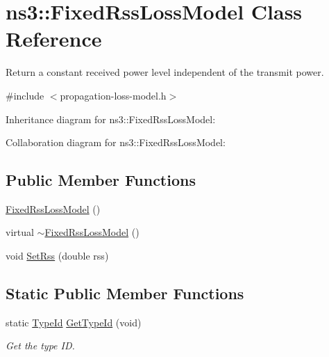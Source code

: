 \hypertarget{classns3_1_1FixedRssLossModel}{}\section{ns3\+:\+:Fixed\+Rss\+Loss\+Model Class Reference}
\label{classns3_1_1FixedRssLossModel}


Return a constant received power level independent of the transmit power.  




{\ttfamily \#include $<$propagation-\/loss-\/model.\+h$>$}



Inheritance diagram for ns3\+:\+:Fixed\+Rss\+Loss\+Model\+:


Collaboration diagram for ns3\+:\+:Fixed\+Rss\+Loss\+Model\+:
\subsection*{Public Member Functions}
\begin{DoxyCompactItemize}
\item 
\hyperlink{classns3_1_1FixedRssLossModel_abb40be2213456262ae3b3b65f772caf3}{Fixed\+Rss\+Loss\+Model} ()
\item 
virtual \hyperlink{classns3_1_1FixedRssLossModel_ad3dfe5752eb76a33a01c66858e32a3c4}{$\sim$\+Fixed\+Rss\+Loss\+Model} ()
\item 
void \hyperlink{classns3_1_1FixedRssLossModel_acf2422ae57b98a4618c8da2b564980b4}{Set\+Rss} (double rss)
\end{DoxyCompactItemize}
\subsection*{Static Public Member Functions}
\begin{DoxyCompactItemize}
\item 
static \hyperlink{classns3_1_1TypeId}{Type\+Id} \hyperlink{classns3_1_1FixedRssLossModel_a558874b171066b6ca87ac0289ee8b786}{Get\+Type\+Id} (void)
\begin{DoxyCompactList}\small\item\em Get the type ID. \end{DoxyCompactList}\end{DoxyCompactItemize}
